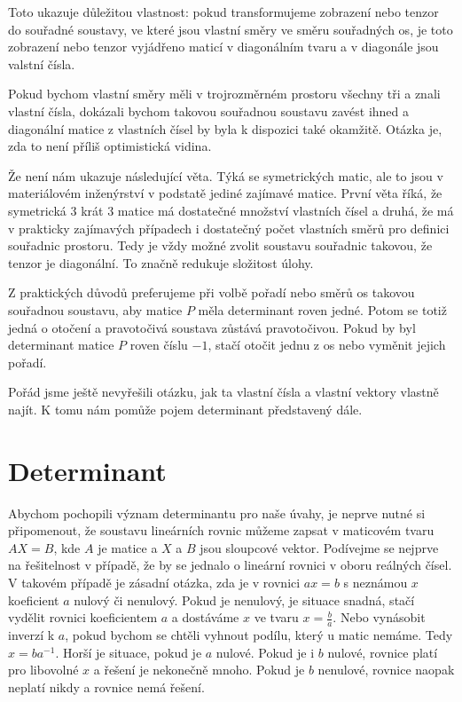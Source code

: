 \documentclass[12pt]{article}
\begin{document}
Toto ukazuje důležitou vlastnost: pokud transformujeme zobrazení nebo tenzor do souřadné soustavy, ve které jsou vlastní směry ve směru souřadných os, je toto zobrazení nebo tenzor vyjádřeno maticí v diagonálním tvaru a v diagonále jsou valstní čísla.

Pokud bychom vlastní směry měli v trojrozměrném prostoru všechny tři a znali vlastní čísla, dokázali bychom takovou souřadnou soustavu zavést ihned a diagonální matice z vlastních čísel by byla k dispozici také okamžitě. Otázka je, zda to není příliš optimistická vidina.

Že není nám ukazuje následující věta. Týká se symetrických matic, ale to jsou v materiálovém inženýrství v podstatě jediné zajímavé matice.  První věta říká, že symetrická 3 krát 3 matice má dostatečné množství vlastních čísel a druhá, že má v prakticky zajímavých případech i dostatečný počet vlastních směrů pro definici souřadnic prostoru. Tedy je vždy možné zvolit soustavu souřadnic takovou, že tenzor je diagonální. To značně redukuje složitost úlohy.

Z praktických důvodů preferujeme při volbě pořadí nebo směrů os takovou souřadnou soustavu, aby matice $P$ měla determinant roven jedné. Potom se totiž jedná o otočení a pravotočivá soustava zůstává pravotočivou. Pokud by byl determinant matice $P$ roven číslu $-1$, stačí otočit jednu z os nebo vyměnit jejich pořadí. 

Pořád jsme ještě nevyřešili otázku, jak ta vlastní čísla a vlastní vektory vlastně najít. K tomu nám pomůže pojem determinant představený dále.

\section{Determinant}

Abychom pochopili význam determinantu pro naše úvahy, je neprve nutné si připomenout, že soustavu lineárních rovnic můžeme zapsat v maticovém tvaru $AX=B$, kde $A$ je matice a $X$ a $B$ jsou sloupcové vektor. Podívejme se nejprve na řešitelnost v případě, že by se jednalo o lineární rovnici v oboru reálných čísel. V takovém  případě je zásadní otázka, zda je v rovnici $ax=b$ s neznámou $x$ koeficient $a$ nulový či nenulový. Pokud je nenulový, je situace snadná, stačí vydělit rovnici koeficientem $a$ a dostáváme $x$ ve tvaru $x=\frac ba$. Nebo vynásobit inverzí k $a$, pokud bychom se chtěli vyhnout podílu, který u matic nemáme. Tedy $x=b a^{-1}.$ Horší je situace, pokud je $a$ nulové. Pokud je i $b$ nulové, rovnice platí pro libovolné $x$ a řešení je nekonečně mnoho. Pokud je $b$ nenulové, rovnice naopak neplatí nikdy a rovnice nemá řešení.
\end{document}
